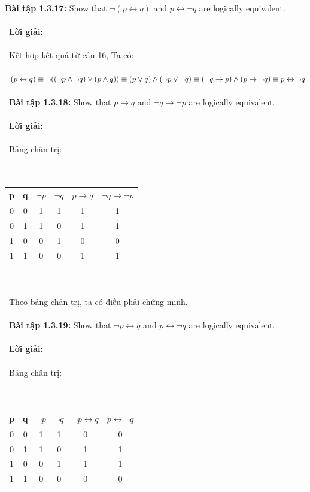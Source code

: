 \documentclass[a4paper]{article}
\begin{document}
\textbf{Bài tập 1.3.17:} Show that $\lnot(p \leftrightarrow q)$ and $p \leftrightarrow \lnot q$ are logically equivalent. \\\ \\\
\textbf{Lời giải:} \\\ \\\
Kết hợp kết quả từ câu 16, Ta có: \\\
$\lnot(p \leftrightarrow q) \\\equiv \lnot((\lnot p \land \lnot q) \lor (p \land q)) \\\equiv (p \lor q) \land (\lnot p \lor \lnot q) \\\equiv (\lnot q \rightarrow p) \land (p \rightarrow \lnot q) \\\equiv p \leftrightarrow \lnot q$ \\\ \\\
\textbf{Bài tập 1.3.18:} Show that $p \rightarrow q$ and $\lnot q \rightarrow \lnot p$ are logically equivalent. \\\ \\\
\textbf{Lời giải: }\\\ \\\
Bảng chân trị: \\\ \\\
\begin{tabular}{|c|c|c|c|c|c|}
\hline 
p & q & $\lnot p$ & $\lnot q$ & $p \rightarrow q$ & $\lnot q \rightarrow \lnot p$ \\ 
\hline 
0 & 0 & 1 & 1 & 1 & 1 \\ 
\hline 
0 & 1 & 1 & 0 & 1 & 1 \\ 
\hline 
1 & 0 & 0 & 1 & 0 & 0 \\ 
\hline 
1 & 1 & 0 & 0 & 1 & 1 \\ 
\hline 
\end{tabular} \\\ \\\
Theo bảng chân trị, ta có điều phải chứng minh. \\\ \\\
\textbf{Bài tập 1.3.19: }Show that $\lnot p \leftrightarrow q$ and $p \leftrightarrow \lnot q$ are logically equivalent. \\\ \\\
\textbf{Lời giải:} \\\ \\\
Bảng chân trị: \\\ \\\
\begin{tabular}{|c|c|c|c|c|c|}
\hline 
p & q & $\lnot p$ & $\lnot q$ & $\lnot p \leftrightarrow q$ & $p \leftrightarrow \lnot q$ \\ 
\hline 
0 & 0 & 1 & 1 & 0 & 0 \\ 
\hline 
0 & 1 & 1 & 0 & 1 & 1 \\ 
\hline 
1 & 0 & 0 & 1 & 1 & 1 \\ 
\hline 
1 & 1 & 0 & 0 & 0 & 0 \\ 
\hline 
\end{tabular} \\\ \\\
\end{document}
